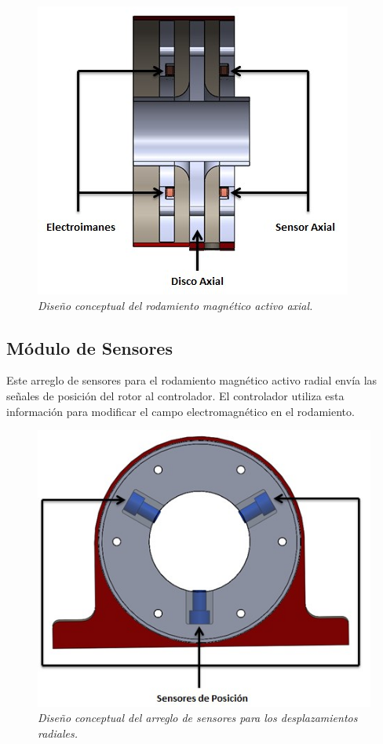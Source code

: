 \begin{figure}[htb]
\centering
	\includegraphics[scale=.65]{images/Capitulo_2/RMAA}
	\caption{\textit{Diseño conceptual del rodamiento magnético activo axial.}}
	\label{fig:system:example1}
\end{figure}

\subsection{Módulo de Sensores}

Este arreglo de sensores para el rodamiento magnético activo radial 
envía las señales de posición del rotor al controlador. El controlador utiliza esta información para modificar el campo electromagnético en el rodamiento.

\begin{figure}[htb]
\centering
	\includegraphics[scale=.65]{images/Capitulo_2/MS}
	\caption{\textit{Diseño conceptual del arreglo de sensores para los desplazamientos radiales.}}
	\label{fig:system:example1}
\end{figure}

